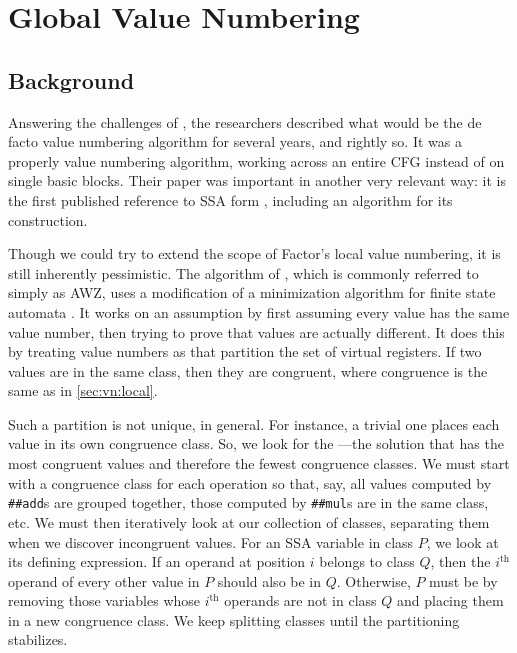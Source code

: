 \section{Global Value Numbering}\label{sec:vn:global}

\subsection{Background}

Answering the challenges of \citeauthor{Cocke}, the researchers
\citeauthor{AWZ} \autocite*{AWZ} described what would be the de facto value
numbering algorithm for several years, and rightly so.  It was a properly
 value numbering algorithm, working across an entire \gls{CFG}
instead of on single basic blocks.  Their paper was important in another very
relevant way: it is the first published reference to SSA form
\autocite{VanDrunen}, including an algorithm for its construction.

Though we could try to extend the scope of Factor's local value numbering, it
is still inherently pessimistic.  The algorithm of \citeauthor{AWZ}, which is
commonly referred to simply as AWZ, uses a modification of a minimization
algorithm for finite state automata \autocite{Hopcroft}.  It works on an
 assumption by first assuming every value has the same value
number, then trying to prove that values are actually different.  It does this
by treating value numbers as  that partition the set
of virtual registers.  If two values are in the same class, then they are
congruent, where congruence is the same as in \cref{sec:vn:local}.

Such a partition is not unique, in general.  For instance, a trivial one places
each value in its own congruence class.  So, we look for the ---the solution that has the most congruent values and therefore
the fewest congruence classes.  We must start with a congruence class for each
operation so that, say, all values computed by \Verb|##add|s are grouped
together, those computed by \Verb|##mul|s are in the same class, etc.  We
must then iteratively look at our collection of classes, separating them when
we discover incongruent values.  For an \gls{SSA} variable in class $P$, we
look at its defining expression.  If an operand at position $i$ belongs to
class $Q$, then the $i^\text{th}$ operand of every other value in $P$ should
also be in $Q$.  Otherwise, $P$ must be  by removing those
variables whose $i^\text{th}$ operands are not in class $Q$ and placing them in
a new congruence class.  We keep splitting classes until the partitioning
stabilizes.

